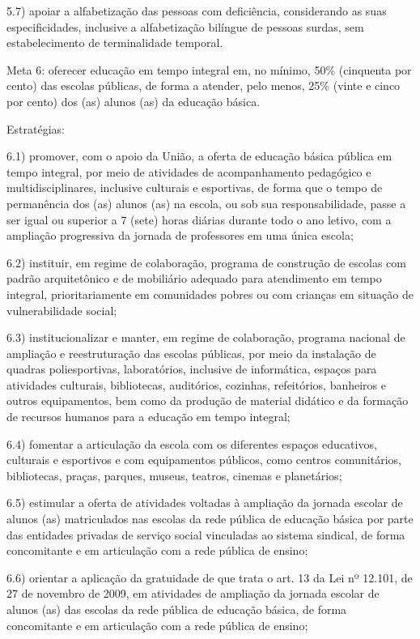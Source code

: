 \documentclass[
]{book}
\begin{document}
5.7) apoiar a alfabetização das pessoas com deficiência, considerando as suas especificidades, inclusive a alfabetização bilíngue de pessoas surdas, sem estabelecimento de terminalidade temporal.

Meta 6: oferecer educação em tempo integral em, no mínimo, 50\% (cinquenta por cento) das escolas públicas, de forma a atender, pelo menos, 25\% (vinte e cinco por cento) dos (as) alunos (as) da educação básica.

Estratégias:

6.1) promover, com o apoio da União, a oferta de educação básica pública em tempo integral, por meio de atividades de acompanhamento pedagógico e multidisciplinares, inclusive culturais e esportivas, de forma que o tempo de permanência dos (as) alunos (as) na escola, ou sob sua responsabilidade, passe a ser igual ou superior a 7 (sete) horas diárias durante todo o ano letivo, com a ampliação progressiva da jornada de professores em uma única escola;

6.2) instituir, em regime de colaboração, programa de construção de escolas com padrão arquitetônico e de mobiliário adequado para atendimento em tempo integral, prioritariamente em comunidades pobres ou com crianças em situação de vulnerabilidade social;

6.3) institucionalizar e manter, em regime de colaboração, programa nacional de ampliação e reestruturação das escolas públicas, por meio da instalação de quadras poliesportivas, laboratórios, inclusive de informática, espaços para atividades culturais, bibliotecas, auditórios, cozinhas, refeitórios, banheiros e outros equipamentos, bem como da produção de material didático e da formação de recursos humanos para a educação em tempo integral;

6.4) fomentar a articulação da escola com os diferentes espaços educativos, culturais e esportivos e com equipamentos públicos, como centros comunitários, bibliotecas, praças, parques, museus, teatros, cinemas e planetários;

6.5) estimular a oferta de atividades voltadas à ampliação da jornada escolar de alunos (as) matriculados nas escolas da rede pública de educação básica por parte das entidades privadas de serviço social vinculadas ao sistema sindical, de forma concomitante e em articulação com a rede pública de ensino;

6.6) orientar a aplicação da gratuidade de que trata o art. 13 da Lei nº 12.101, de 27 de novembro de 2009, em atividades de ampliação da jornada escolar de alunos (as) das escolas da rede pública de educação básica, de forma concomitante e em articulação com a rede pública de ensino;
\end{document}

